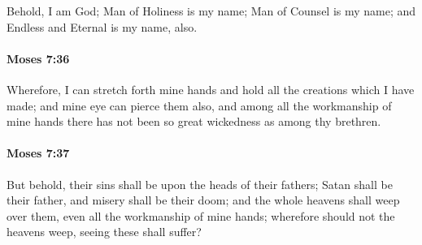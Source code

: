 			Behold, I am God; Man of Holiness is my name; Man of Counsel is my name; and Endless and Eternal is my name, also.


		\paragraph{Moses 7:36} %
			\label{MOSES-7-36}

			Wherefore, I can stretch forth mine hands and hold all the creations which I have made; and mine eye can pierce them also, and among all the workmanship of mine hands there has not been so great wickedness as among thy brethren.


		\paragraph{Moses 7:37} %
			\label{MOSES-7-37}

			But behold, their sins shall be upon the heads of their fathers; Satan shall be their father, and misery shall be their doom; and the whole heavens shall weep over them, even all the workmanship of mine hands; wherefore should not the heavens weep, seeing these shall suffer?



